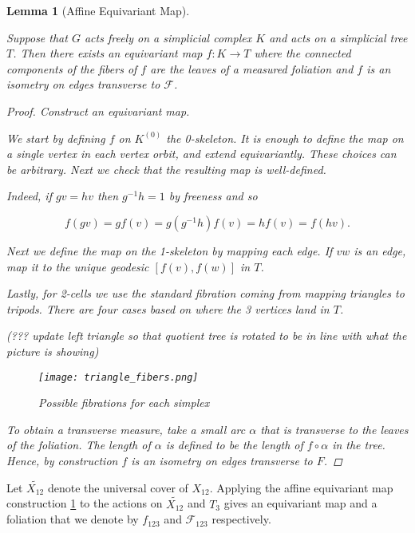 \documentclass[12pt,parskip=full]{report}
\theoremstyle{plain}
\newtheorem{lem}[thm]{Lemma}
\theoremstyle{definition}
\begin{document}
\begin{lem}
    [Affine Equivariant Map]
    \label{lem:affineequivariantmap} 


    Suppose that \(G\) acts freely on a simplicial complex \(K\) and acts on a simplicial tree \(T\). Then there exists an equivariant map \(f: K \to T\) where the connected components of the fibers of \(f\) are the leaves of a measured foliation and \(f\) is an isometry on edges transverse to \(\mathscr{F}\).
    \begin{proof}
        Construct an equivariant map.

        We start by defining \(f\) on \(K^{(0)}\) the 0-skeleton. It is enough to define the map on a single vertex in each vertex orbit, and extend equivariantly. These choices can be arbitrary. Next we check that the resulting map is well-defined. 
        
        Indeed, if \(gv=hv\) then \(g^{-1} h = 1\) by freeness and so
        
        \[ f(gv) = gf(v) = g(g^{-1}h)f(v) = hf(v) = f(hv). \]
        
        Next we define the map on the 1-skeleton by mapping each edge. If \(vw\) is an edge, map it to the unique geodesic \([f(v), f(w)]\) in \(T\).
        
        Lastly, for 2-cells we use the standard fibration coming from mapping triangles to tripods. There are four cases based on where the 3 vertices land in \(T\). 
        
(??? update left triangle so that quotient tree is rotated to be in line with what the picture is showing)        
\begin{figure}[htp]
    \centering
    \texttt{[image: triangle\_fibers.png]}
    \caption{Possible fibrations for each simplex}
    \label{fig:triangle_fibers}
\end{figure}
        
        To obtain a transverse measure, take a small arc \(\alpha\) that is transverse to the leaves of the foliation. The length of \(\alpha\) is defined to be the length of \(f \circ \alpha\) in the tree. Hence, by construction \(f\) is an isometry on edges transverse to \(F\).
    \end{proof}
\end{lem}


Let \(\widetilde {X_{12}}\) denote the universal cover of \(X_{12}\).  Applying the affine equivariant map construction \ref{lem:affineequivariantmap} to the actions on \(\widetilde {X_{12}}\) and \(T_{3}\) gives an equivariant  map and a foliation that we denote by \(f_{123}\) and \(\mathscr{F}_{123}\) respectively.
\end{document}
